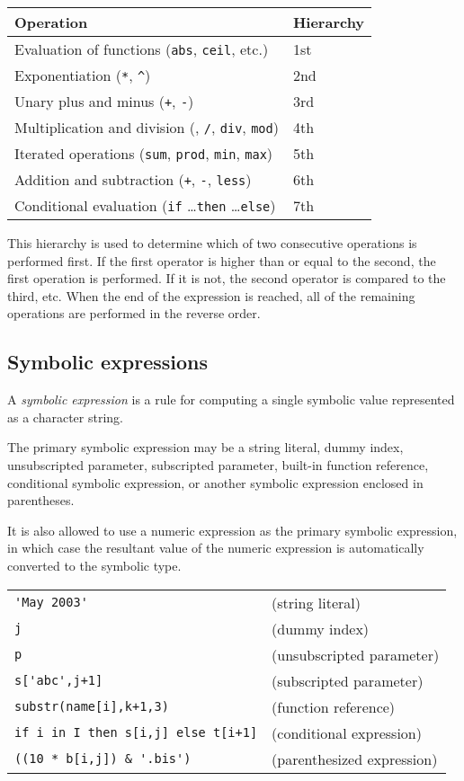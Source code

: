 \documentclass[10pt]{article}
\begin{document}
\noindent\hfil
\begin{tabular}{@{}ll@{}}
Operation&Hierarchy\\
\hline
Evaluation of functions ({\tt abs}, {\tt ceil}, etc.)&1st\\
Exponentiation ({\tt**}, {\tt\textasciicircum})&2nd\\
Unary plus and minus ({\tt+}, {\tt-})&3rd\\
Multiplication and division ({\tt*}, {\tt/}, {\tt div}, {\tt mod})&4th\\
Iterated operations ({\tt sum}, {\tt prod}, {\tt min}, {\tt max})&5th\\
Addition and subtraction ({\tt+}, {\tt-}, {\tt less})&6th\\
Conditional evaluation ({\tt if} \dots {\tt then} \dots {\tt else})&
7th\\
\end{tabular}

\medskip

This hierarchy is used to determine which of two consecutive operations
is performed first. If the first operator is higher than or equal to
the second, the first operation is performed. If it is not, the second
operator is compared to the third, etc. When the end of the expression
is reached, all of the remaining operations are performed in the
reverse order.

\newpage

\subsection{Symbolic expressions}

A {\it symbolic expression} is a rule for computing a single symbolic
value represented as a character string.

The primary symbolic expression may be a string literal, dummy index,
unsubscripted parameter, subscripted parameter, built-in function
reference, conditional symbolic expression, or another symbolic
expression enclosed in parentheses.

It is also allowed to use a numeric expression as the primary symbolic
expression, in which case the resultant value of the numeric expression
is automatically converted to the symbolic type.

\medskip


\medskip

\noindent
\begin{tabular}{@{}ll@{}}
\verb|'May 2003'|&(string literal)\\
\verb|j|&(dummy index)\\
\verb|p|&(unsubscripted parameter)\\
\verb|s['abc',j+1]|&(subscripted parameter)\\
\verb|substr(name[i],k+1,3)|&(function reference)\\
\verb|if i in I then s[i,j] else t[i+1]|&(conditional expression)\\
\verb|((10 * b[i,j]) & '.bis')|&(parenthesized expression)\\
\end{tabular}
\end{document}

